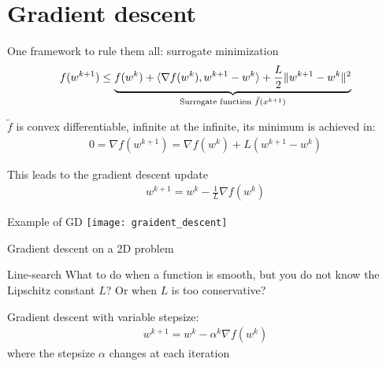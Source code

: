 

\section{Gradient descent}


\begin{frame}{One framework to rule them all: surrogate minimization}
    \begin{align*}
        f(w^{k+1})
        \leq
        \underbrace{f(w^{k})
        + \langle \nabla f (w^{k}), w^{k+1} - w^{k} \rangle
        + \frac{L}{2} \lVert {w^{k+1} - w^{k}} \rVert^2}_{\text{Surrogate function } \tilde{f}(x^{k+1})}
    \end{align*}

    \pause

    $\tilde{f}$ is convex differentiable, infinite at the infinite, its minimum is achieved in:
    \begin{align*}
        0 = \nabla f (w^{k+1}) = \nabla f (w^{k}) + L (w^{k+1} - w^{k})
    \end{align*}

    \pause
    This leads to the gradient descent update
    \begin{align*}
        w^{k+1} = w^k - \frac{1}{L} \nabla f (w^k)
    \end{align*}
\end{frame}

\begin{frame}{Example of GD}
    \centering
    \texttt{[image: graident\_descent]}

    Gradient descent on a 2D problem
\end{frame}

\begin{frame}{Line-search }
    What to do when a function is smooth, but you do not know the Lipschitz constant $L$? Or when $L$ is too conservative?

    \pause
    Gradient descent with variable stepsize:
    \begin{align*}
        w^{k+1} = w^k - \alpha^k \nabla f (w^k)
    \end{align*}
    where the stepsize $\alpha$ changes at each iteration
\end{frame}

